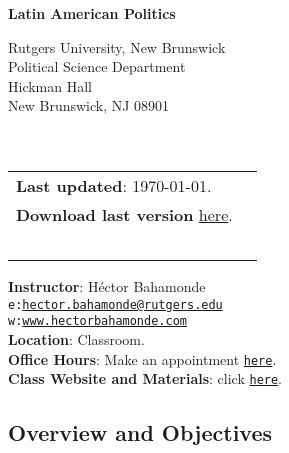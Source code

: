 \documentclass[letterpaper]{article}
\def\name{Latin American Politics}
\begin{document}

\centerline{\huge \bf \name}

\vspace{0.25in}

\begin{minipage}{0.45\linewidth}
  Rutgers University, New Brunswick \\
  Political Science Department \\
  Hickman Hall \\
  New Brunswick, NJ 08901\\
  \\
  \\

\end{minipage}
\hspace{4cm}\begin{minipage}{0.45\linewidth}
  \begin{tabular}{ll}
{\bf Last updated}: \today. \\
 {\bf Download last version} \href{https://github.com/hbahamonde/Latin_American_Politics_UGRAD/raw/master/Bahamonde_Latin_American_Politics_Syllabus_UGRAD.pdf}{here}.\\
   {\bf {\color{red}{\scriptsize Not intended as a definitive version}}} %
    \\
    \\
    \\
    \\
    \\
  \end{tabular}
\end{minipage}

\vspace{-5mm}
{\bf Instructor}: H\'ector Bahamonde\\
\texttt{e:}\href{mailto:hector.bahamonde@rutgers.edu}{\texttt{hector.bahamonde@rutgers.edu}}\\
\texttt{w:}\href{http://www.hectorbahamonde.com}{\texttt{www.hectorbahamonde.com}}\\
{\bf Location}: Classroom.\\
{\bf Office Hours}: Make an appointment \href{https://calendly.com/bahamonde/officehours}{\texttt{here}}.\\
{\bf Class Website and Materials}: click \href{https://github.com/hbahamonde/Latin_American_Politics_UGRAD}{\texttt{here}}.

\subsection*{Overview and Objectives}
\end{document}

